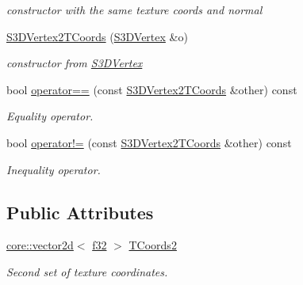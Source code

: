 \begin{DoxyCompactItemize}
\begin{DoxyCompactList}\small\item\em constructor with the same texture coords and normal \end{DoxyCompactList}\item 
\mbox{\label{structirr_1_1video_1_1S3DVertex2TCoords_ac83609ae26733087c1aee35763881f3f}} 
\hyperlink{structirr_1_1video_1_1S3DVertex2TCoords_ac83609ae26733087c1aee35763881f3f}{S3\+D\+Vertex2\+T\+Coords} (\hyperlink{structirr_1_1video_1_1S3DVertex}{S3\+D\+Vertex} \&o)
\begin{DoxyCompactList}\small\item\em constructor from \hyperlink{structirr_1_1video_1_1S3DVertex}{S3\+D\+Vertex} \end{DoxyCompactList}\item 
\mbox{\label{structirr_1_1video_1_1S3DVertex2TCoords_a98609ec21b65ce72bebbd0be09e8553b}} 
bool \hyperlink{structirr_1_1video_1_1S3DVertex2TCoords_a98609ec21b65ce72bebbd0be09e8553b}{operator==} (const \hyperlink{structirr_1_1video_1_1S3DVertex2TCoords}{S3\+D\+Vertex2\+T\+Coords} \&other) const
\begin{DoxyCompactList}\small\item\em Equality operator. \end{DoxyCompactList}\item 
\mbox{\label{structirr_1_1video_1_1S3DVertex2TCoords_a0ea9fd4f215bc4677cd192fc0dc31376}} 
bool \hyperlink{structirr_1_1video_1_1S3DVertex2TCoords_a0ea9fd4f215bc4677cd192fc0dc31376}{operator!=} (const \hyperlink{structirr_1_1video_1_1S3DVertex2TCoords}{S3\+D\+Vertex2\+T\+Coords} \&other) const
\begin{DoxyCompactList}\small\item\em Inequality operator. \end{DoxyCompactList}\end{DoxyCompactItemize}
\subsection*{Public Attributes}
\begin{DoxyCompactItemize}
\item 
\mbox{\label{structirr_1_1video_1_1S3DVertex2TCoords_a5b15fa7998105f759c359307fbccbf7c}} 
\hyperlink{classirr_1_1core_1_1vector2d}{core\+::vector2d}$<$ \hyperlink{namespaceirr_a0277be98d67dc26ff93b1a6a1d086b07}{f32} $>$ \hyperlink{structirr_1_1video_1_1S3DVertex2TCoords_a5b15fa7998105f759c359307fbccbf7c}{T\+Coords2}
\begin{DoxyCompactList}\small\item\em Second set of texture coordinates. \end{DoxyCompactList}\end{DoxyCompactItemize}


